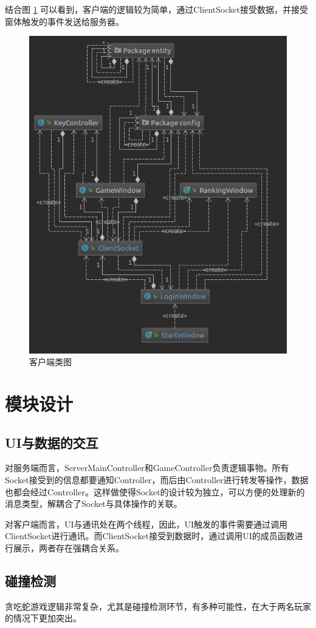 \documentclass[12pt]{article}
\begin{document}
  结合图 \ref{fig:clientcg} 可以看到，客户端的逻辑较为简单，通过ClientSocket接受数据，并接受窗体触发的事件发送给服务器。

\begin{figure}[h]
\centering
\includegraphics[width=0.7\linewidth]{clientcg}
\caption{客户端类图}
\label{fig:clientcg}
\end{figure}

  \section{模块设计}
   
  \subsection*{UI与数据的交互}
  对服务端而言，ServerMainController和GameController负责逻辑事物。所有Socket接受到的信息都要通知Controller，而后由Controller进行转发等操作，数据也都会经过Controller。这样做使得Socket的设计较为独立，可以方便的处理新的消息类型，解耦合了Socket与具体操作的关联。
  
  对客户端而言，UI与通讯处在两个线程，因此，UI触发的事件需要通过调用ClientSocket进行通讯。而ClientSocket接受到数据时，通过调用UI的成员函数进行展示，两者存在强耦合关系。
  
  \subsection*{碰撞检测}
  贪吃蛇游戏逻辑非常复杂，尤其是碰撞检测环节，有多种可能性，在大于两名玩家的情况下更加突出。
  
\end{document}
